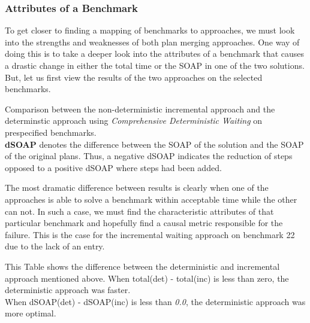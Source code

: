 \documentclass{llncs}
\begin{document}
\subsubsection{Attributes of a Benchmark}
To get closer to finding a mapping of benchmarks to approaches, we must look into the strengths and weaknesses of both plan merging approaches. One way of doing this is to take a deeper look into the attributes of a benchmark that causes a drastic change in either the total time or the SOAP in one of the two solutions.\\
But, let us first view the results of the two approaches on the selected benchmarks.\\

\begin{table}[]
    \centering
    \hspace{1cm}
    \vspace{1cm}
    \caption{Comparison between the non-deterministic incremental approach and the determinstic approach using \emph{Comprehensive Deterministic Waiting} on prespecified benchmarks.\\
    \textbf{dSOAP} denotes the difference between the SOAP of the solution and the SOAP of the original plans. Thus, a negative dSOAP indicates the reduction of steps opposed to a positive dSOAP where steps had been added.}
    \label{tab:tab2}
\end{table}
\newpage
The most dramatic difference between results is clearly when one of the approaches is able to solve a benchmark within acceptable time while the other can not. In such a case, we must find the characteristic attributes of that particular benchmark and hopefully find a causal metric responsible for the failure.
This is the case for the incremental waiting approach on benchmark 22 due to the lack of an entry.


\begin{table}[]
    \centering
    \vspace{1cm}
    \caption{This Table shows the difference between the deterministic and incremental approach mentioned above. When total(det) - total(inc) is less than zero, the deterministic approach was faster.\\
    When dSOAP(det) - dSOAP(inc) is less than \emph{0.0}, the deterministic approach was more optimal.}
    \label{tab:tab3}
\end{table}
\end{document}
